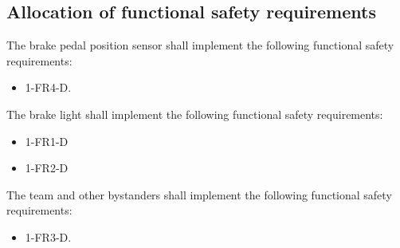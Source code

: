 \subsection{Allocation of functional safety requirements}
%
% 
%
%
%
The brake pedal position sensor shall implement the following functional safety requirements:
\begin{itemize}
\item 1-FR4-D.
\end{itemize}
The brake light shall implement the following functional safety requirements:
\begin{itemize}
\item 1-FR1-D
\item 1-FR2-D
\end{itemize}
The team and other bystanders shall implement the following functional safety requirements:
\begin{itemize}
\item 1-FR3-D.
\end{itemize}
